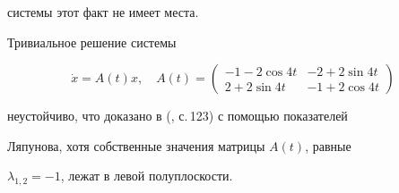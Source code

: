 системы этот факт не имеет места.





\begin{exam}


Тривиальное решение системы


$$


\Dot x=A(t)x,\quad A(t)=


\begin{pmatrix}


-1-2\cos 4t & -2+2\sin 4t \\


2+2\sin 4t & -1+2\cos 4t


\end{pmatrix}


$$


неустойчиво, что доказано в (\cite{9}, с.\,123) с помощью показателей 


Ляпунова, хотя собственные значения матрицы $A(t)$, равные 


$\lambda_{1,2}=-1$, лежат в левой полуплоскости.


\end{exam}





